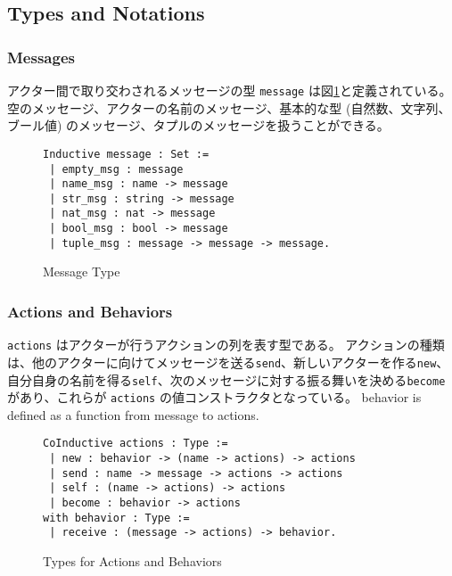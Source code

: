 

\subsection{Types and Notations}

\subsubsection{Messages}
アクター間で取り交わされるメッセージの型 \texttt{message} は図\ref{coq:message}と定義されている。
空のメッセージ、アクターの名前のメッセージ、基本的な型 (自然数、文字列、ブール値) のメッセージ、タプルのメッセージを扱うことができる。

\begin{figure}[tb]
\begin{lstlisting}
Inductive message : Set :=
 | empty_msg : message
 | name_msg : name -> message
 | str_msg : string -> message
 | nat_msg : nat -> message
 | bool_msg : bool -> message
 | tuple_msg : message -> message -> message.
\end{lstlisting}
\caption{Message Type}\label{coq:message}
\end{figure}


\subsubsection{Actions and Behaviors}

\texttt{actions} はアクターが行うアクションの列を表す型である。
アクションの種類は、他のアクターに向けてメッセージを送る\texttt{send}、新しいアクターを作る\texttt{new}、自分自身の名前を得る\texttt{self}、次のメッセージに対する振る舞いを決める\texttt{become}があり、これらが \texttt{actions} の値コンストラクタとなっている。
behavior is defined as a function from message to actions.

\begin{figure}[tb]
\begin{lstlisting}
CoInductive actions : Type :=
 | new : behavior -> (name -> actions) -> actions
 | send : name -> message -> actions -> actions
 | self : (name -> actions) -> actions
 | become : behavior -> actions
with behavior : Type :=
 | receive : (message -> actions) -> behavior.
\end{lstlisting}
\caption{Types for Actions and Behaviors}\label{coq:actions}
\end{figure}

